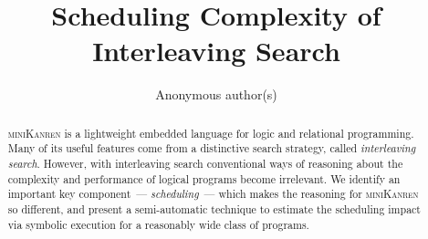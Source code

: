 \documentclass[runningheadsm, envcountsect]{llncs}
\newcommand{\mK}{\textsc{miniKanren}\xspace}
\begin{document}
\linenumbers

\makeatletter
\let\origsection\section
\renewcommand\section{\@ifstar{\starsection}{\nostarsection}}

\newcommand\nostarsection[1]
{\sectionprelude\origsection{#1}\sectionpostlude}

\newcommand\starsection[1]
{\sectionprelude\origsection*{#1}\sectionpostlude}

\newcommand\sectionprelude{%
  \vspace{-2mm}
}

\newcommand\sectionpostlude{%
  \vspace{-2mm}
}
\makeatother

\setlength{\abovecaptionskip}{-5pt plus 3pt minus 2pt}
\setlength{\belowcaptionskip}{-20pt plus 3pt minus 2pt}

\abovedisplayskip-1mm
\abovedisplayshortskip-3mm

\setlength{\topsep}{0pt}
\setlength{\partopsep}{0pt plus 0pt minus 0pt}
\setlength{\parskip}{0pt}

\title{Scheduling Complexity of Interleaving Search}

\author{Anonymous author(s)}
%
%

\maketitle

\begin{abstract}
  \mK is a lightweight embedded language for logic and relational programming. Many of its useful features come from
  a distinctive search strategy, called \emph{interleaving search}. However, with interleaving search conventional  
  ways of reasoning about the complexity and performance of logical programs become irrelevant. We identify an important
  key component~--- \emph{scheduling}~--- which makes the reasoning for \mK so different, and present a semi-automatic
  technique to estimate the scheduling impact via symbolic execution for a reasonably wide class of programs.
\end{abstract}
\end{document}

